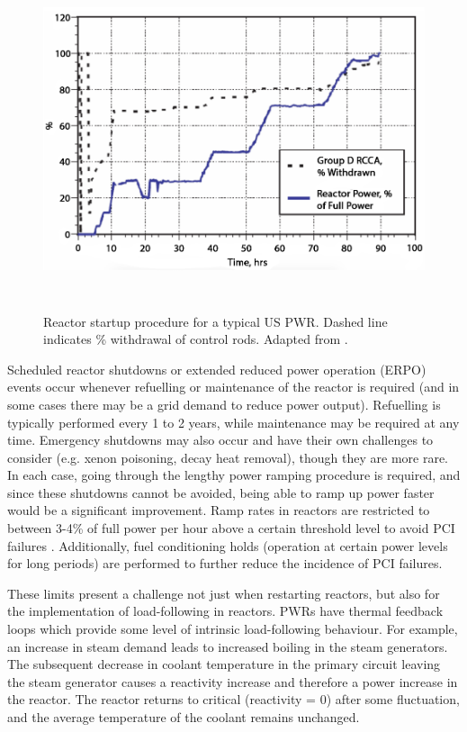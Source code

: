 \begin{figure}[ht]
\centering
\includegraphics[height=10cm]{images/reactor_startup.png}
\caption[Reactor startup procedure for a typical US PWR. Dashed line indicates \% withdrawal of control rods.]{Reactor startup procedure for a typical US PWR. Dashed line indicates \% withdrawal of control rods. Adapted from \cite{ramping}.}
\label{figure:reactor_startup}
\end{figure}

Scheduled reactor shutdowns or extended reduced power operation (ERPO) events occur whenever refuelling or maintenance of the reactor is required (and in some cases there may be a grid demand to reduce power output).  Refuelling is typically performed every 1 to 2 years, while maintenance may be required at any time. Emergency shutdowns may also occur and have their own challenges to consider (e.g. xenon poisoning, decay heat removal), though they are more rare. In each case, going through the lengthy power ramping procedure is required, and since these shutdowns cannot be avoided, being able to ramp up power faster would be a significant improvement. Ramp rates in reactors are restricted to between 3-4\% of full power per hour above a certain threshold level to avoid PCI failures \cite{ramping}. Additionally, fuel conditioning holds (operation at certain power levels for long periods) are performed to further reduce the incidence of PCI failures. 

These limits present a challenge not just when restarting reactors, but also for the implementation of load-following in reactors. PWRs have thermal feedback loops which provide some level of intrinsic load-following behaviour. For example, an increase in steam demand leads to increased boiling in the steam generators. The subsequent decrease in coolant temperature in the primary circuit leaving the steam generator causes a reactivity increase and therefore a power increase in the reactor. The reactor returns to critical (reactivity = 0) after some fluctuation, and the average temperature of the coolant remains unchanged.

